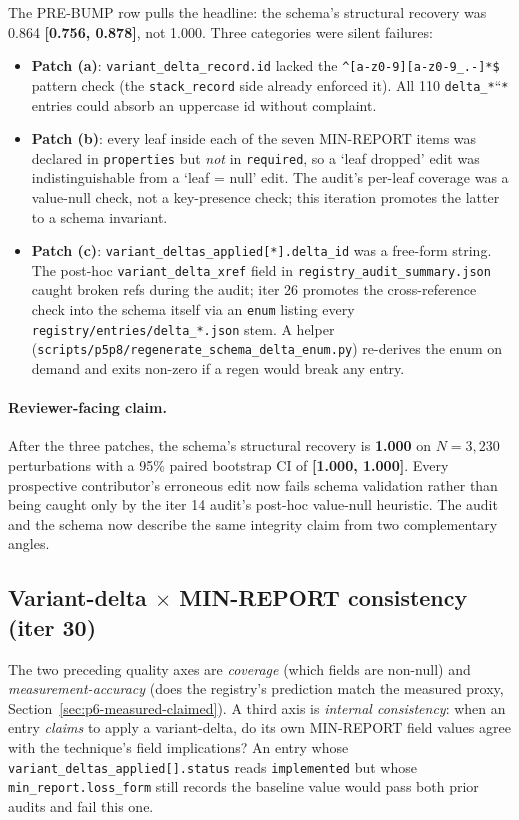 \documentclass{article}
\providecommand{\secref}[1]{Section~\ref{#1}}
\begin{document}
The PRE-BUMP row pulls the headline: the schema's structural
recovery was 0.864 \textbf{[0.756, 0.878]}, not 1.000. Three
categories were silent failures:

\begin{itemize}
\item \textbf{Patch (a)}: \texttt{variant\_delta\_record.id} lacked
the \verb|^[a-z0-9][a-z0-9_.-]*$| pattern check (the
\texttt{stack\_record} side already enforced it). All 110
\texttt{delta\_*}``\texttt{*} entries could absorb an uppercase id
without complaint.
\item \textbf{Patch (b)}: every leaf inside each of the seven
MIN-REPORT items was declared in \texttt{properties} but \emph{not} in
\texttt{required}, so a `leaf dropped' edit was indistinguishable from
a `leaf = null' edit. The audit's per-leaf coverage was a value-null
check, not a key-presence check; this iteration promotes the latter to a
schema invariant.
\item \textbf{Patch (c)}:
\texttt{variant\_deltas\_applied[*].delta\_id} was a free-form string.
The post-hoc \texttt{variant\_delta\_xref} field in
\texttt{registry\_audit\_summary.json} caught broken refs during the
audit; iter 26 promotes the cross-reference check into the schema
itself via an \texttt{enum} listing every
\texttt{registry/entries/delta\_*.json} stem. A helper
(\texttt{scripts/p5p8/regenerate\_schema\_delta\_enum.py}) re-derives
the enum on demand and exits non-zero if a regen would break any entry.
\end{itemize}

\paragraph{Reviewer-facing claim.} After the three patches, the
schema's structural recovery is \textbf{1.000} on $N=3{,}230$
perturbations with a 95\% paired bootstrap CI of \textbf{[1.000, 1.000]}.
Every prospective contributor's erroneous edit now fails schema
validation rather than being caught only by the iter 14 audit's
post-hoc value-null heuristic. The audit and the schema now describe
the same integrity claim from two complementary angles.

\subsection{Variant-delta $\times$ MIN-REPORT consistency (iter 30)}
\label{sec:p6-delta-consistency}

The two preceding quality axes are \emph{coverage} (which fields are
non-null) and \emph{measurement-accuracy} (does the registry's
prediction match the measured proxy, \secref{sec:p6-measured-claimed}).
A third axis is \emph{internal consistency}: when an entry
\emph{claims} to apply a variant-delta, do its own MIN-REPORT field
values agree with the technique's field implications? An entry whose
\texttt{variant\_deltas\_applied[].status} reads \texttt{implemented}
but whose \texttt{min\_report.loss\_form} still records the baseline
value would pass both prior audits and fail this one.
\end{document}
